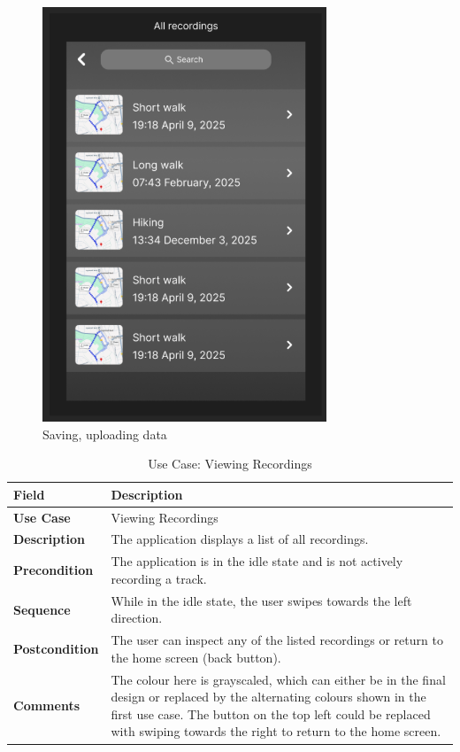 \documentclass[12pt]{article}
\begin{document}
\begin{figure}[h!]
    \centering
    \includegraphics[width=\textwidth]{Project_Screenshots/recording.png}
    \caption{Saving, uploading data}
\end{figure}
\begin{table}[h!]
\centering
\begin{tabular}{|p{3cm}|p{11cm}|}
\hline
\textbf{Field} & \textbf{Description} \\
\hline
\textbf{Use Case}   & Viewing Recordings \\
\hline
\textbf{Description} & The application displays a list of all recordings. \\
\hline
\textbf{Precondition} & The application is in the idle state and is not actively recording a track. \\
\hline
\textbf{Sequence} & While in the idle state, the user swipes towards the left direction. \\
\hline
\textbf{Postcondition} & The user can inspect any of the listed recordings or return to the home screen (back button). \\
\hline
\textbf{Comments} & The colour here is grayscaled, which can either be in the final design or replaced by the alternating colours shown in the first use case. The button on the top left could be replaced with swiping towards the right to return to the home screen. \\
\hline
\end{tabular}
\caption{Use Case: Viewing Recordings}
\end{table}
\end{document}

